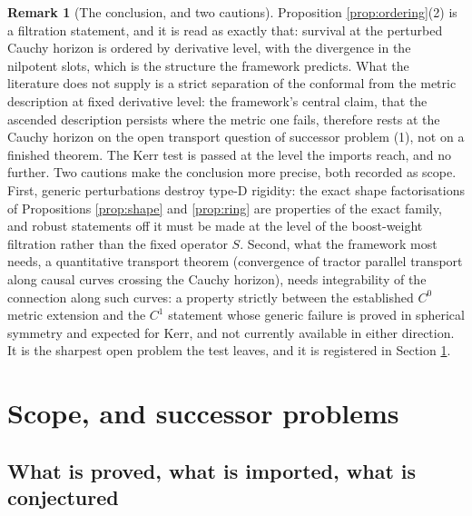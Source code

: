 \documentclass[11pt]{article}
\theoremstyle{definition}
\newtheorem{remark}[theorem]{Remark}
\begin{document}
\begin{remark}[The conclusion, and two cautions]\label{rem:verdict}
Proposition \ref{prop:ordering}(2) is a filtration statement, and it is read as exactly that: survival at the perturbed Cauchy horizon is ordered by derivative level, with the divergence in the nilpotent slots, which is the structure the framework predicts. What the literature does not supply is a strict separation of the conformal from the metric description at fixed derivative level: the framework's central claim, that the ascended description persists where the metric one fails, therefore rests at the Cauchy horizon on the open transport question of successor problem (1), not on a finished theorem. The Kerr test is passed at the level the imports reach, and no further. Two cautions make the conclusion more precise, both recorded as scope. First, generic perturbations destroy type-D rigidity: the exact shape factorisations of Propositions \ref{prop:shape} and \ref{prop:ring} are properties of the exact family, and robust statements off it must be made at the level of the boost-weight filtration rather than the fixed operator $S$. Second, what the framework most needs, a quantitative transport theorem (convergence of tractor parallel transport along causal curves crossing the Cauchy horizon), needs integrability of the connection along such curves: a property strictly between the established $C^0$ metric extension and the $C^1$ statement whose generic failure is proved in spherical symmetry and expected for Kerr, and not currently available in either direction. It is the sharpest open problem the test leaves, and it is registered in Section \ref{sec:scope}.
\end{remark}

\section{Scope, and successor problems}\label{sec:scope}

\subsection*{What is proved, what is imported, what is conjectured}
\end{document}
